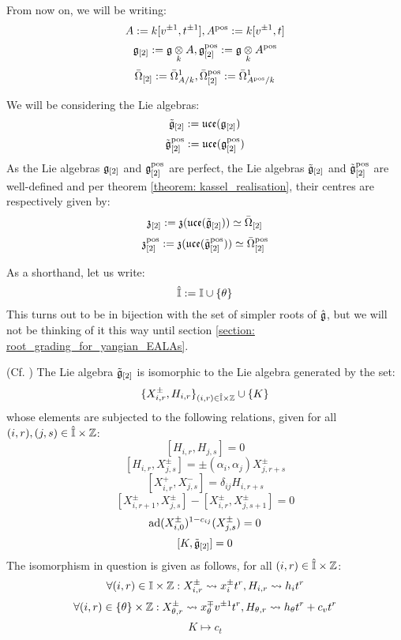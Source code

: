         \begin{convention}
            From now on, we will be writing:
                $$A := k[v^{\pm 1}, t^{\pm 1}], A^{\mathrm{pos}} := k[v^{\pm 1}, t]$$
                $$\g_{[2]} := \g \tensor_k A, \g_{[2]}^{\positive} := \g \tensor_k A^{\positive}$$
                $$\bar{\Omega}_{[2]} := \bar{\Omega}^1_{A/k}, \bar{\Omega}_{[2]}^{\mathrm{pos}} := \bar{\Omega}^1_{A^{\mathrm{pos}}/k}$$

            We will be considering the Lie algebras:
                $$\tilde{\mathfrak{g}}_{[2]} := \mathfrak{uce}(\mathfrak{g}_{[2]})$$
                $$\tilde{\mathfrak{g}}_{[2]}^{\mathrm{pos}} := \mathfrak{uce}(\mathfrak{g}_{[2]}^{\mathrm{pos}})$$
            As the Lie algebras $\mathfrak{g}_{[2]}$ and $\mathfrak{g}_{[2]}^{\mathrm{pos}}$ are perfect, the Lie algebras $\tilde{\mathfrak{g}}_{[2]}$ and $\tilde{\mathfrak{g}}_{[2]}^{\mathrm{pos}}$ are well-defined and per theorem \ref{theorem: kassel_realisation}, their centres are respectively given by:
                $$\mathfrak{z}_{[2]} := \mathfrak{z}(\mathfrak{uce}(\tilde{\mathfrak{g}}_{[2]})) \simeq \bar{\Omega}_{[2]}$$
                $$\mathfrak{z}_{[2]}^{\mathrm{pos}} := \mathfrak{z}(\mathfrak{uce}(\tilde{\mathfrak{g}}_{[2]}^{\mathrm{pos}})) \simeq \bar{\Omega}_{[2]}^{\mathrm{pos}}$$
        \end{convention}
        \begin{convention}
            As a shorthand, let us write:
                $$\hat{\mathbb{I}} := \mathbb{I} \cup \{\theta\}$$
            This turns out to be in bijection with the set of simpler roots of $\hat{\mathfrak{g}}$, but we will not be thinking of it this way until section \ref{section: root_grading_for_yangian_EALAs}.
        \end{convention}
        \begin{lemma} \label{lemma: chevalley_serre_presentation_for_central_extensions_of_multiloop_algebras}
            (Cf. \cite[Proposition 3.5]{moody_rao_yokonuma_vertex_representations_of_toroidal_lie_algebras}) The Lie algebra $\tilde{\mathfrak{g}}_{[2]}$ is isomorphic to the Lie algebra generated by the set:
                $$\{ X_{i, r}^{\pm}, H_{i, r} \}_{(i, r) \in \hat{\simpleroots} \x \Z} \cup \{ K \}$$
            whose elements are subjected to the following relations, given for all $(i, r), (j, s) \in \hat{\simpleroots} \x \Z$:
                $$[ H_{i, r}, H_{j, s} ] = 0$$
                $$[ H_{i, r}, X_{j, s}^{\pm} ] = \pm (\alpha_i, \alpha_j) X_{j, r + s}^{\pm}$$
                $$[ X_{i, r}^+, X_{j, s}^- ] = \delta_{ij} H_{i, r + s}$$
                $$[ X_{i, r + 1}^{\pm}, X_{j, s}^{\pm} ] - [ X_{i, r}^{\pm}, X_{j, s + 1}^{\pm} ] = 0$$
                $$\mathrm{ad}(X_{i, 0}^{\pm})^{1 - c_{ij}}( X_{j, s}^{\pm} ) = 0$$
                $$[K, \tilde{\mathfrak{g}}_{[2]}] = 0$$
            The isomorphism in question is given as follows, for all $(i, r) \in \hat{\simpleroots} \x \Z$:
                $$\forall (i, r) \in \simpleroots \x \Z: X_{i, r}^{\pm} \mapsto x_i^{\pm} t^r, H_{i, r} \mapsto h_i t^r$$
                $$\forall (i, r) \in \{\theta\} \x \Z: X_{\theta, r}^{\pm} \mapsto x_{\theta}^{\mp} v^{\pm 1} t^r, H_{\theta, r} \mapsto h_{\theta} t^r + c_v t^r$$
                $$K \mapsto c_t$$
        \end{lemma}

